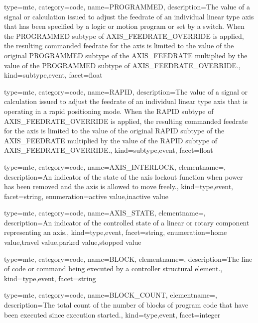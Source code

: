 {
  type=mtc,
  category=code,
  name={PROGRAMMED},
  description={The value of a signal or calculation issued to adjust the feedrate of an individual linear type axis that has been specified by a logic or motion program or set by a switch. \newline When the PROGRAMMED subtype of AXIS\_FEEDRATE\_OVERRIDE is applied, the resulting commanded feedrate for the axis is limited to the value of the original PROGRAMMED subtype of the AXIS\_FEEDRATE multiplied by the value of the PROGRAMMED subtype of AXIS\_FEEDRATE\_OVERRIDE.},
  kind={subtype,event},
  facet={\gls{float}}
}


{
  type=mtc,
  category=code,
  name={RAPID},
  description={The value of a signal or calculation issued to adjust the feedrate of an individual linear type axis that is operating in a rapid positioning mode. \newline When the RAPID subtype of AXIS\_FEEDRATE\_OVERRIDE is applied, the resulting commanded feedrate for the axis is limited to the value of the original RAPID subtype of the AXIS\_FEEDRATE multiplied by the value of the RAPID subtype of AXIS\_FEEDRATE\_OVERRIDE.},
  kind={subtype,event},
  facet={\gls{float}}
}


{
  type=mtc,
  category=code,
  name={AXIS\_INTERLOCK},
  elementname=,
  description={An indicator of the state of the axis lockout function when power has been removed and the axis is allowed to move freely.},
  kind={type,event},
  facet={\gls{string}},
  enumeration={\gls{active value},\gls{inactive value}}
}


{
  type=mtc,
  category=code,
  name={AXIS\_STATE},
  elementname=,
  description={An indicator of the controlled state of a \gls{linear} or \gls{rotary} component representing an axis.},
  kind={type,event},
  facet={\gls{string}},
  enumeration={\gls{home value},\gls{travel value},\gls{parked value},\gls{stopped value}}
}


{
  type=mtc,
  category=code,
  name={BLOCK},
  elementname=,
  description={The line of code or command being executed by a \gls{controller} \gls{structural element}.},
  kind={type,event},
  facet={\gls{string}}
}


{
  type=mtc,
  category=code,
  name={BLOCK\_COUNT},
  elementname=,
  description={The total count of the number of blocks of program code that have been executed since execution started.},
  kind={type,event},
  facet={\gls{integer}}
}


